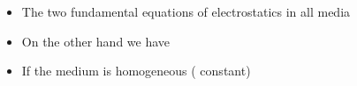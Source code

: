 \ELhold


\begin{ELunit}

\begin{itemize}
\tightlist
\item
  The two fundamental equations of electrostatics in all media
\end{itemize}


\begin{itemize}
\tightlist
\item
  On the other hand we have
\end{itemize}


\end{ELunit}

\begin{ELjoin}

\begin{itemize}
\tightlist
\item
  If the medium is homogeneous (\ELim{\epsilon} constant)
\end{itemize}

\begin{ELimportant}{}


\end{ELimportant}

\end{ELjoin}

